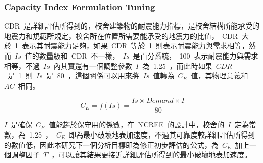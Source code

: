 
\subsubsection{Capacity Index Formulation Tuning}

CDR~是詳細評估所得到的，校舍建築物的耐震能力指標，是校舍結構所能承受的地震力和規範所規定，校舍所在位置所需要能承受的地震力的比值，~CDR~大於~1~表示其耐震能力足夠，如果~CDR~等於~1~則表示耐震能力與需求相等，然而~$Is$~值的數量級和~CDR~不一樣，~$Is$~是百分系統，~100~表示耐震能力與需求相等，不過~$Is$~內其實還有一個調整參數~$I$~為~1.25~，而此時如果~$CDR$~是~1~則~$Is$~是~80~，這個關係可以用來將~$Is$~值轉為~$C_E$~值，其物理意義和~$AC$~相同。


\begin{equation} C_E = f(Is) = \dfrac{Is \times Demand \times I}{80}  \label{eq:CE}\end{equation}

$I$~是確保~$C_E$~值能趨於保守用的係數，在~NCREE~的設計中，校舍的~$I$~定為常數，為~1.25~，~$C_E$~即為最小破壞地表加速度，不過其可靠度較詳細評估所得到的數值低，因此本研究下一個分析目標即為修正初步評估的公式，為~$C_E$~加上一個調整因子~$T$~，可以讓其結果更接近詳細評估所得到的最小破壞地表加速度。

